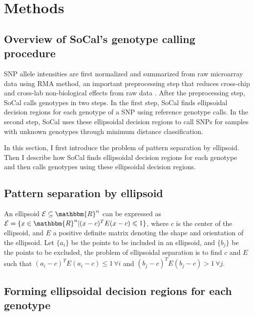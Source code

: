 \documentclass{scrartcl}
\begin{document}
\section{Methods}

\subsection{Overview of SoCal's genotype calling procedure}

\par
SNP allele intensities are first normalized and summarized from raw microarray
data using RMA method, an important preprocessing step that reduces cross-chip
and cross-lab non-biological effects from raw data
\cite{bolstad2003,carvalho2007}.
After the preprocessing step, SoCal calls genotypes in two steps.
In the first step, SoCal finds ellipsoidal decision regions for each genotype
of a SNP using reference genotype calls.
In the second step, SoCal uses these ellipsoidal decision regions to call SNPs
for samples with unknown genotypes through minimum distance classification.

\par
In this section, I first introduce the problem of pattern separation by
ellipsoid.
Then I describe how SoCal finds ellipsoidal decision regions for each
genotype and then calls genotypes using these ellipsoidal decision regions.

\subsection{Pattern separation by ellipsoid}

\par
An ellipsoid $\mathcal{E} \subseteq \mathbbm{R}^{n}$ can be expressed as
$\mathcal{E} = \{x \in \mathbbm{R}^{n} | (x-c)^TE(x-c)\leqslant1\}$, where
$c$ is the center of the ellipsoid, and $E$ a positive definite matrix
denoting the shape and orientation of the ellipsoid.
Let $\{a_i\}$ be the points to be included in an ellipsoid, and $\{b_j\}$
be the points to be excluded, the problem of ellipsoidal separation is to find
$c$ and $E$ such that $(a_i-c)^TE(a_i-c)\leqslant1 \, \forall i$ and
$(b_j-c)^TE(b_j-c)>1 \, \forall j$.

\subsection{Forming ellipsoidal decision regions for each genotype}
\end{document}

